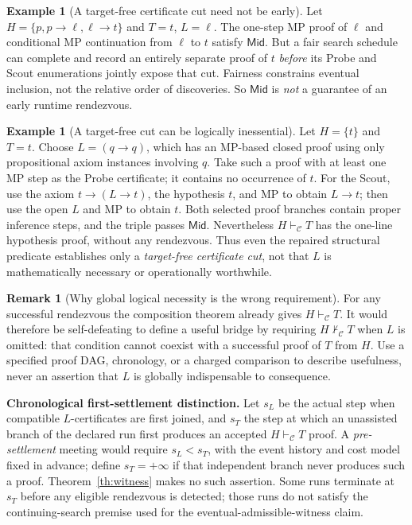 \documentclass[11pt,letterpaper]{article}
\theoremstyle{definition}
\newtheorem{example}[theorem]{Example}
\newtheorem{remark}[theorem]{Remark}
\newcommand{\vdC}{\vdash_{\mathcal C}}
\newcommand{\nvdC}{\nvdash_{\mathcal C}}
\newcommand{\Mid}{\mathsf{Mid}}
\begin{document}
\begin{example}[A target-free certificate cut need not be early]\label{ex:notearly}
Let $H=\{p,p\to \ell,\ell\to t\}$ and $T=t$, $L=\ell$.
The one-step MP proof of $\ell$ and conditional MP continuation
from $\ell$ to $t$ satisfy $\Mid$. But a fair search schedule can
complete and record an entirely separate proof of $t$ \emph{before}
its Probe and Scout enumerations jointly expose that cut. Fairness
constrains eventual inclusion, not the relative order of discoveries.
So $\Mid$ is \emph{not} a guarantee of an early runtime rendezvous.
\end{example}

\begin{example}[A target-free cut can be logically inessential]\label{ex:inessential}
Let $H=\{t\}$ and $T=t$. Choose $L=(q\to q)$, which has an MP-based
closed proof using only propositional axiom instances involving $q$.
Take such a proof with at least one MP step as the Probe certificate;
it contains no occurrence of $t$. For the Scout, use the axiom
$t\to(L\to t)$, the hypothesis $t$, and MP to obtain $L\to t$;
then use the open $L$ and MP to obtain $t$. Both selected proof branches
contain proper inference steps, and the triple passes $\Mid$.
Nevertheless $H\vdC T$ has the one-line hypothesis proof, without any
rendezvous. Thus even the repaired structural predicate establishes
only a \emph{target-free certificate cut}, not that $L$ is mathematically
necessary or operationally worthwhile.
\end{example}

\begin{remark}[Why global logical necessity is the wrong requirement]
For any successful rendezvous the composition theorem already gives
$H\vdC T$. It would therefore be self-defeating to define a useful
bridge by requiring $H\nvdC T$ when $L$ is omitted: that condition
cannot coexist with a successful proof of $T$ from $H$. Use a specified
proof DAG, chronology, or a charged comparison to describe usefulness,
never an assertion that $L$ is globally indispensable to consequence.
\end{remark}

\begin{keybox}
\textbf{Chronological first-settlement distinction.} Let $s_L$ be the
actual step when compatible $L$-certificates are first joined, and
$s_T$ the step at which an unassisted branch of the declared run first
produces an accepted $H\vdC T$ proof. A \emph{pre-settlement} meeting
would require $s_L<s_T$, with the event history and cost model fixed
in advance; define $s_T=+\infty$ if that independent branch never
produces such a proof. Theorem~\ref{th:witness} makes no such assertion. Some
runs terminate at $s_T$ before any eligible rendezvous is detected;
those runs do not satisfy the continuing-search premise used for the
eventual-admissible-witness claim.
\end{keybox}
\end{document}
